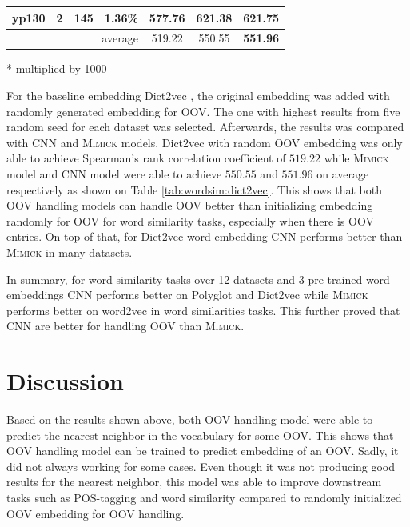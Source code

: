 \begin{table}[!ht]
\begin{threeparttable}
\begin{center}
\begin{tabular}{l|c|c|c|c|c|c}
          yp130 & 2 & 145 & 1.36\% & 577.76 & 621.38 & \textbf{621.75}\\
          \hline
          \multicolumn{4}{r|}{average} & 519.22 & 550.55 & \textbf{551.96}\\
        \end{tabular}
        \begin{tablenotes}
          \item[*] multiplied by 1000
        \end{tablenotes}
      \end{center}
    \end{threeparttable} 
    \end{table}

    For the baseline embedding Dict2vec \citep{dict2vect2017tissier},
    the original embedding was added with randomly generated embedding
    for OOV. The one with highest results from five random seed for
    each dataset was selected. Afterwards, the results was compared
    with CNN and \textsc{Mimick} models. Dict2vec with random OOV
    embedding was only able to achieve Spearman's rank correlation
    coefficient of $519.22$ while \textsc{Mimick} model and CNN model
    were able to achieve $550.55$ and $551.96$ on average respectively
    as shown on Table \ref{tab:wordsim:dict2vec}. This shows that both
    OOV handling models can handle OOV better than initializing
    embedding randomly for OOV for word similarity tasks, especially
    when there is OOV entries. On top of that, for Dict2vec word
    embedding CNN performs better than \textsc{Mimick} in many datasets.

    In summary, for word similarity tasks over 12 datasets and 3
    pre-trained word embeddings CNN performs better on Polyglot and
    Dict2vec while \textsc{Mimick} performs better on word2vec in word
    similarities tasks. This further proved that CNN are better for
    handling OOV than \textsc{Mimick}.

  \section{Discussion}
    Based on the results shown above, both OOV handling model were
    able to predict the nearest neighbor in the vocabulary for some
    OOV. This shows that OOV handling model can be trained to predict
    embedding of an OOV. Sadly, it did not always working for some
    cases. Even though it was not producing good results for the
    nearest neighbor, this model was able to improve downstream tasks
    such as POS-tagging and word similarity compared to randomly
    initialized OOV embedding for OOV handling.

